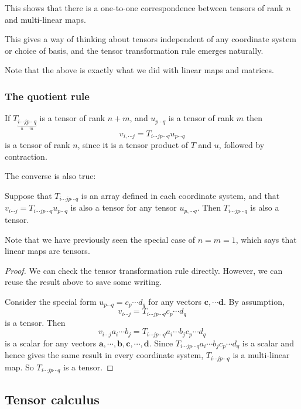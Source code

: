 \documentclass[a4paper]{article}
\begin{document}
This shows that there is a one-to-one correspondence between tensors of rank $n$ and multi-linear maps.

This gives a way of thinking about tensors independent of any coordinate system or choice of basis, and the tensor transformation rule emerges naturally.

Note that the above is exactly what we did with linear maps and matrices.
\subsubsection{The quotient rule}
If $T_{\underbrace{i\cdots j}_n\underbrace{p\cdots q}_m}$ is a tensor of rank $n+ m$, and $u_{p\cdots q}$ is a tensor of rank $m$ then
\[
  v_{i, \cdots j}= T_{i\cdots j p\cdots q}u_{p\cdots q}
\]
is a tensor of rank $n$, since it is a tensor product of $T$ and $u$, followed by contraction.

The converse is also true:
\begin{prop}
  Suppose that $T_{i\cdots jp\cdots q}$ is an array defined in each coordinate system, and that $v_{i\cdots j} = T_{i\cdots jp\cdots q} u_{p\cdots q}$ is also a tensor for any tensor $u_{p, \cdots q}$. Then $T_{i\cdots j p\cdots q}$ is also a tensor.
\end{prop}

Note that we have previously seen the special case of $n = m = 1$, which says that linear maps are tensors.
\begin{proof}
  We can check the tensor transformation rule directly. However, we can reuse the result above to save some writing.

  Consider the special form $u_{p \cdots q} = c_p \cdots d_q$ for any vectors $\mathbf{c}, \cdots \mathbf{d}$. By assumption, 
  \[
    v_{i\cdots j} = T_{i\cdots jp\cdots q}c_p\cdots d_q
  \]
  is a tensor. Then
  \[
    v_{i\cdots j}a_i \cdots b_j = T_{i\cdots jp\cdots q}a_i\cdots b_jc_p\cdots d_q
  \]
  is a scalar for any vectors $\mathbf{a}, \cdots, \mathbf{b}, \mathbf{c},\cdots, \mathbf{d}$. Since $T_{i\cdots jp\cdots q}a_i\cdots b_jc_p\cdots d_q$ is a scalar and hence gives the same result in every coordinate system, $T_{i\cdots jp\cdots q}$ is a multi-linear map. So $T_{i\cdots jp\cdots q}$ is a tensor.
\end{proof}


\subsection{Tensor calculus}
\end{document}

